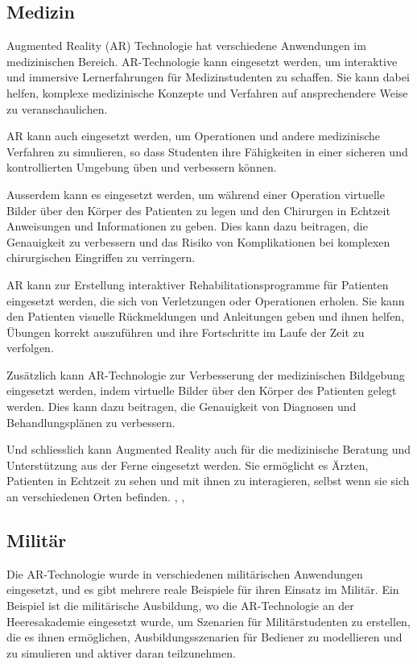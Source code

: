 \subsection{Medizin}
Augmented Reality (AR) Technologie hat verschiedene Anwendungen im medizinischen Bereich. AR-Technologie kann eingesetzt werden, um interaktive und immersive Lernerfahrungen für Medizinstudenten zu schaffen. Sie kann dabei helfen, komplexe medizinische Konzepte und Verfahren auf ansprechendere Weise zu veranschaulichen. 

AR kann auch eingesetzt werden, um Operationen und andere medizinische Verfahren zu simulieren, so dass Studenten ihre Fähigkeiten in einer sicheren und kontrollierten Umgebung üben und verbessern können. 

Ausserdem kann es eingesetzt werden, um während einer Operation virtuelle Bilder über den Körper des Patienten zu legen und den Chirurgen in Echtzeit Anweisungen und Informationen zu geben. Dies kann dazu beitragen, die Genauigkeit zu verbessern und das Risiko von Komplikationen bei komplexen chirurgischen Eingriffen zu verringern. 

AR kann zur Erstellung interaktiver Rehabilitationsprogramme für Patienten eingesetzt werden, die sich von Verletzungen oder Operationen erholen. Sie kann den Patienten visuelle Rückmeldungen und Anleitungen geben und ihnen helfen, Übungen korrekt auszuführen und ihre Fortschritte im Laufe der Zeit zu verfolgen. 

Zusätzlich kann AR-Technologie zur Verbesserung der medizinischen Bildgebung eingesetzt werden, indem virtuelle Bilder über den Körper des Patienten gelegt werden. Dies kann dazu beitragen, die Genauigkeit von Diagnosen und Behandlungsplänen zu verbessern. 

Und schliesslich kann Augmented Reality auch für die medizinische Beratung und Unterstützung aus der Ferne eingesetzt werden. Sie ermöglicht es Ärzten, Patienten in Echtzeit zu sehen und mit ihnen zu interagieren, selbst wenn sie sich an verschiedenen Orten befinden. \cite{Bhatla2022AugmentedRT}, \cite{Parsons2021CurrentPO}, \cite{Hsieh2018PreliminarySO}

\subsection{Militär}
Die AR-Technologie wurde in verschiedenen militärischen Anwendungen eingesetzt, und es gibt mehrere reale Beispiele für ihren Einsatz im Militär. Ein Beispiel ist die militärische Ausbildung, wo die AR-Technologie an der Heeresakademie eingesetzt wurde, um Szenarien für Militärstudenten zu erstellen, die es ihnen ermöglichen, Ausbildungsszenarien für Bediener zu modellieren und zu simulieren und aktiver daran teilzunehmen. 

